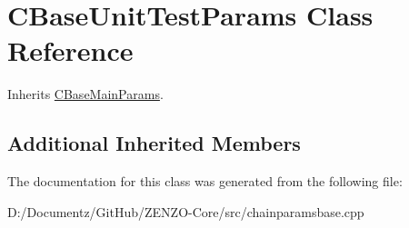 \hypertarget{class_c_base_unit_test_params}{}\section{C\+Base\+Unit\+Test\+Params Class Reference}
\label{class_c_base_unit_test_params}


Inherits \mbox{\hyperlink{class_c_base_main_params}{C\+Base\+Main\+Params}}.

\subsection*{Additional Inherited Members}


The documentation for this class was generated from the following file\+:\begin{DoxyCompactItemize}
\item 
D\+:/\+Documentz/\+Git\+Hub/\+Z\+E\+N\+Z\+O-\/\+Core/src/chainparamsbase.\+cpp\end{DoxyCompactItemize}
